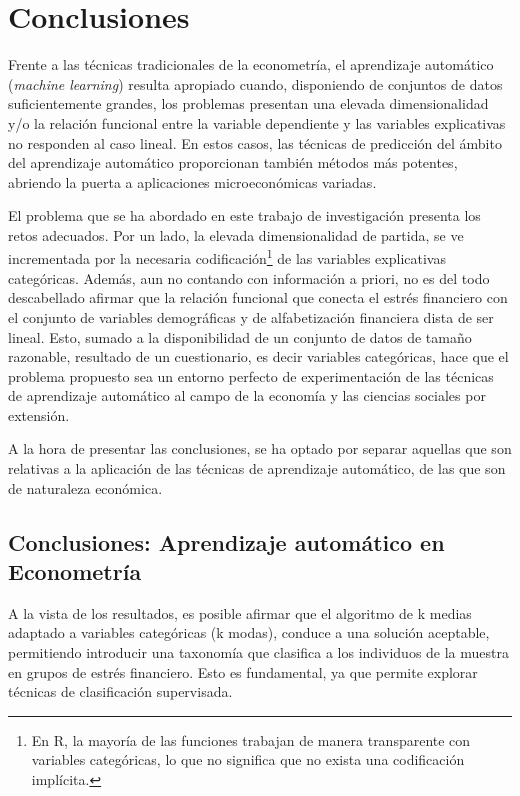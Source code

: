 \documentclass[a4paper, 11pt]{article}
\begin{document}
\section{Conclusiones}
\label{sec:conclusions}
Frente a las técnicas tradicionales de la econometría, el aprendizaje automático 
(\textit{machine learning}) resulta apropiado cuando, disponiendo de conjuntos de
datos suficientemente grandes, los problemas presentan una elevada dimensionalidad
y/o la relación funcional entre la variable dependiente y las variables explicativas
no responden al caso lineal. En estos casos, las técnicas de predicción del ámbito del
aprendizaje automático proporcionan también métodos más potentes, abriendo la puerta a
aplicaciones microeconómicas variadas.

El problema que se ha abordado en este trabajo de investigación presenta los retos 
adecuados. Por un lado, la elevada dimensionalidad de partida, se ve incrementada
por la necesaria codificación\footnote{En R, la mayoría de las funciones trabajan
de manera transparente con variables categóricas, lo que no significa que no exista una
codificación implícita.} de las variables explicativas categóricas. Además, 
aun no contando con información a priori,  no es del todo descabellado afirmar que
la relación funcional que conecta el estrés financiero con el conjunto de variables
demográficas y de alfabetización financiera dista de ser lineal. Esto, sumado a la 
disponibilidad de un conjunto de datos de tamaño razonable, resultado de un 
cuestionario, es decir variables categóricas, hace que el problema 
propuesto sea un entorno perfecto de experimentación de las técnicas de aprendizaje
automático al campo de la economía y las ciencias sociales por extensión.

A la hora de presentar las conclusiones, se ha optado por separar aquellas que son
relativas a la aplicación de las técnicas de aprendizaje automático, de las que son
de naturaleza económica. 

\subsection{Conclusiones: Aprendizaje automático en Econometría}
\label{sec:sub:conclusions_ml}
A la vista de los resultados, es posible afirmar que el algoritmo de k medias adaptado
a variables categóricas (k modas), conduce a una solución aceptable, permitiendo introducir
una taxonomía que clasifica a los individuos de la muestra en grupos de estrés financiero. 
Esto es fundamental, ya que permite explorar técnicas de clasificación supervisada. 
\end{document}
